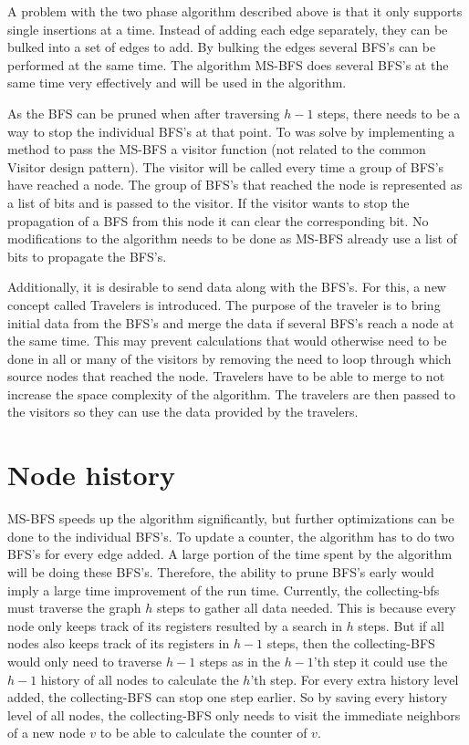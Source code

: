 A problem with the two phase algorithm described above is that it only supports single insertions at a time. Instead of adding each edge separately, they can be bulked into a set of edges to add. By bulking the edges several BFS's can be performed at the same time. The algorithm MS-BFS \cite{msbfs} does several BFS's at the same time very effectively and will be used in the algorithm. 

As the BFS can be pruned when after traversing $h-1$ steps, there needs to be a way to stop the individual BFS's at that point. To was solve by implementing a method to pass the MS-BFS a visitor function (not related to the common Visitor design pattern). The visitor will be called every time a group of BFS's have reached a node. The group of BFS's that reached the node is represented as a list of bits and is passed to the visitor. If the visitor wants to stop the propagation of a BFS from this node it can clear the corresponding bit. No modifications to the algorithm needs to be done as MS-BFS already use a list of bits to propagate the BFS's.

Additionally, it is desirable to send data along with the BFS's. For this, a new concept called Travelers is introduced. The purpose of the traveler is to bring initial data from the BFS's and merge the data if several BFS's reach a node at the same time. This may prevent calculations that would otherwise need to be done in all or many of the visitors by removing the need to loop through which source nodes that reached the node. Travelers have to be able to merge to not increase the space complexity of the algorithm. The travelers are then passed to the visitors so they can use the data provided by the travelers. 

\section{Node history}

MS-BFS speeds up the algorithm significantly, but further optimizations can be done to the individual BFS's. To update a counter, the algorithm has to do two BFS's for every edge added. A large portion of the time spent by the algorithm will be doing these BFS's. Therefore, the ability to prune BFS's early would imply a large time improvement of the run time. Currently, the collecting-bfs must traverse the graph $h$ steps to gather all data needed. This is because every node only keeps track of its registers resulted by a search in $h$ steps. But if all nodes also keeps track of its registers in $h-1$ steps, then the collecting-BFS would only need to traverse $h-1$ steps as in the $h-1$'th step it could use the $h-1$ history of all nodes to calculate the $h$'th step. For every extra history level added, the collecting-BFS can stop one step earlier. So by saving every history level of all nodes, the collecting-BFS only needs to visit the immediate neighbors of a new node $v$ to be able to calculate the counter of $v$. 

